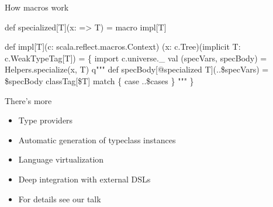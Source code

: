 \documentclass[svgnames,dvipsnames,hyperref={bookmarks=false},usepdftitle=false]{beamer}
\begin{document}
\begin{frame}[fragile]{How macros work}

\begin{semiverbatim}
def specialized[T](x: => T) = macro impl[T]

def impl[T](\alert<1>{c: scala.reflect.macros.Context})
    \alert<2>{(x: c.Tree)(implicit T: c.WeakTypeTag[T])} = \{
  \alert<1>{import c.universe._}
  \alert<2>{val (specVars, specBody) = Helpers.specialize(x, T)}
  \alert<3>{q"""}
    \alert<3>{def specBody[@specialized T](..\$specVars) = \$specBody}
    \alert<3>{classTag[\$T] match \{ case ..\$cases \}}
  \alert<3>{"""}
\}
\end{semiverbatim}

\begin{itemize}
\end{itemize}

\end{frame}

\begin{frame}{There's more}

\begin{itemize}
\item Type providers
\item Automatic generation of typeclass instances
\item Language virtualization
\item Deep integration with external DSLs
\item For details see our  talk
\end{itemize}

\end{frame}

\end{document}

